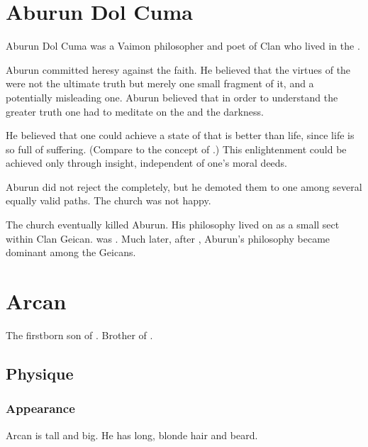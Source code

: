 \section{Aburun Dol Cuma}
Aburun Dol Cuma was a Vaimon philosopher and poet of Clan  who lived in the \VaimonCaliphate.

Aburun committed heresy against the  faith.
He believed that the virtues of the \sephiroth were not the ultimate truth but merely one small fragment of it, and a potentially misleading one. 
Aburun believed that in order to understand the greater truth one had to meditate on the \qliphoth and the darkness. 

He believed that one could achieve a state of  that is better than life, since life is so full of suffering. 
(Compare to the concept of .)
This enlightenment could be achieved only through insight, independent of one's moral deeds. 

Aburun did not reject the \sephiroth completely, but he demoted them to one among several equally valid paths. 
The church was not happy.

The church eventually killed Aburun.
His philosophy lived on as a small sect within Clan Geican.
\Belzir was . 
Much later, after \Belzir, Aburun's philosophy became dominant among the Geicans.















\section{Arcan \Delaen}
The firstborn son of . 
Brother of . 









\subsection{Physique}
\subsubsection{Appearance}
Arcan is tall and big. 
He has long, blonde hair and beard. 















